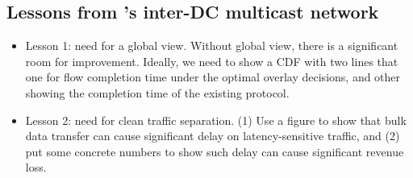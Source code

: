 \subsection{Lessons from \company's inter-DC multicast network}
\begin{itemize}

\item Lesson 1: need for a global view. Without global view, there is a significant room for improvement. Ideally, we need to show a CDF with two lines that one for flow completion time under the optimal overlay decisions, and other showing the completion time of the existing protocol. 

\item Lesson 2: need for clean traffic separation. (1) Use a figure to show that bulk data transfer can cause significant delay on latency-sensitive traffic, and (2) put some concrete numbers to show such delay can cause significant revenue loss.

\end{itemize}

